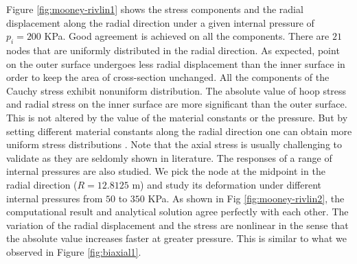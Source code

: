 Figure \ref{fig:mooney-rivlin1} shows the stress components and the radial displacement along the radial direction under a given internal pressure of $p_i = 200$ KPa. Good agreement is achieved on all the components. There are $21$ nodes that are uniformly distributed in the radial direction. As expected, point on the outer surface undergoes less radial displacement than the inner surface in order to keep the area of cross-section unchanged. All the components of the Cauchy stress exhibit nonuniform distribution. The absolute value of hoop stress and radial stress on the inner surface are more significant than the outer surface. This is not altered by the value of the material constants or the pressure. But by setting different material constants along the radial direction one can obtain more uniform stress distributions \cite{Batra}. Note that the axial stress is usually challenging to validate as they are seldomly shown in literature. The responses of a range of internal pressures are also studied. We pick the node at the midpoint in the radial direction ($R = 12.8125$ m) and study its deformation under different internal pressures from $50$ to $350$ KPa. As shown in Fig \ref{fig:mooney-rivlin2}, the computational result and analytical solution agree perfectly with each other. The variation of the radial displacement and the stress are nonlinear in the sense that the absolute value increases faster at greater pressure. This is similar to what we observed in Figure \ref{fig:biaxial1}.

